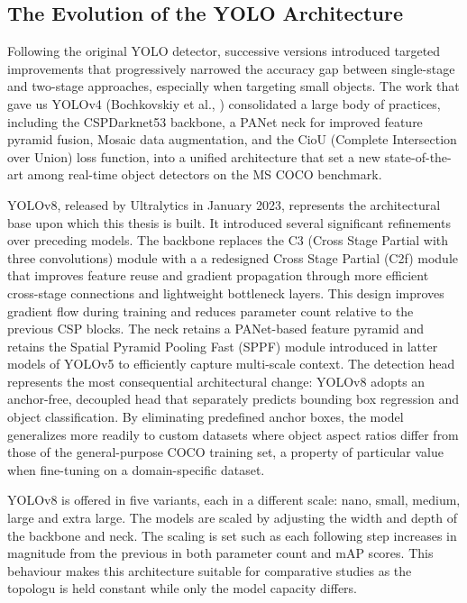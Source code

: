 \subsection{The Evolution of the YOLO Architecture}
Following the original YOLO detector, successive versions introduced targeted improvements that progressively narrowed the accuracy gap between single-stage and two-stage approaches, especially when targeting small objects. The work that gave us YOLOv4 (Bochkovskiy et al., \cite{RN09}) consolidated a large body of practices, including the CSPDarknet53 backbone, a PANet neck for improved feature pyramid fusion, Mosaic data augmentation, and the CioU (Complete Intersection over Union) loss function, into a unified architecture that set a new state-of-the-art among real-time object detectors on the MS COCO benchmark.

YOLOv8, released by Ultralytics in January 2023\cite{RN10}, represents the architectural base upon which this thesis is built. It introduced several significant refinements over preceding models. The backbone replaces the C3 (Cross Stage Partial with three convolutions) module with a a redesigned Cross Stage Partial (C2f) module that improves feature reuse and gradient propagation through more efficient cross-stage connections and lightweight bottleneck layers. This design improves gradient flow during training and reduces parameter count relative to the previous CSP blocks. The neck retains a PANet-based feature pyramid and retains the Spatial Pyramid Pooling Fast (SPPF) module introduced in latter models of YOLOv5 to efficiently capture multi-scale context. The detection head represents the most consequential architectural change: YOLOv8 adopts an anchor-free, decoupled head that separately predicts bounding box regression and object classification. By eliminating predefined anchor boxes, the model generalizes more readily to custom datasets where object aspect ratios differ from those of the general-purpose COCO training set, a property of particular value when fine-tuning on a domain-specific dataset.

YOLOv8 is offered in five variants, each in a different scale: nano, small, medium, large and extra large. The models are scaled by adjusting the width and depth of the backbone and neck. The scaling is set such as each following step increases in magnitude from the previous in both parameter count and mAP scores. This behaviour makes this architecture suitable for comparative studies as the topologu is held constant while only the model capacity differs.


